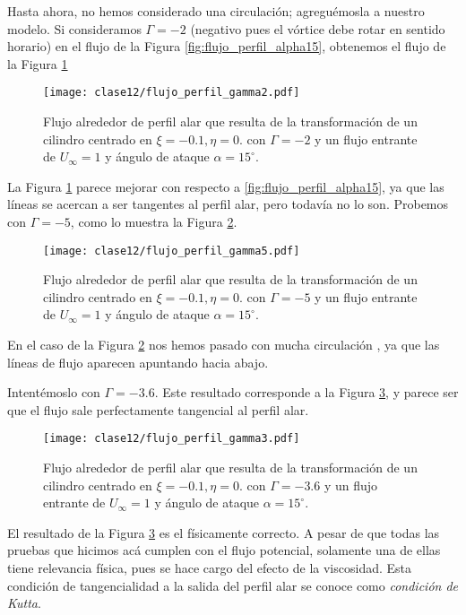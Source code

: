 Hasta ahora, no hemos considerado una circulación; agreguémosla a nuestro modelo.
Si consideramos $\Gamma=-2$ (negativo pues el vórtice debe rotar en sentido horario) en el flujo de la Figura \ref{fig:flujo_perfil_alpha15}, obtenemos el flujo de la Figura \ref{fig:flujo_perfil_gamma2}
%
\begin{figure}[h!]
\centering
\texttt{[image: clase12/flujo\_perfil\_gamma2.pdf]}
\caption{Flujo alrededor de perfil alar que resulta de la transformación de un cilindro centrado en $\xi=-0.1, \eta=0.$ con $\Gamma=-2$ y un flujo entrante de $U_\infty=1$ y ángulo de ataque $\alpha=15^\circ$.}\label{fig:flujo_perfil_gamma2}
\end{figure}

La Figura \ref{fig:flujo_perfil_gamma2} parece mejorar con respecto a \ref{fig:flujo_perfil_alpha15}, ya que las líneas se acercan a ser tangentes al perfil alar, pero todavía no lo son.
Probemos con $\Gamma=-5$, como lo muestra la Figura \ref{fig:flujo_perfil_gamma5}.
%
\begin{figure}[h!]
\centering
\texttt{[image: clase12/flujo\_perfil\_gamma5.pdf]}
\caption{Flujo alrededor de perfil alar que resulta de la transformación de un cilindro centrado en $\xi=-0.1, \eta=0.$ con $\Gamma=-5$ y un flujo entrante de $U_\infty=1$ y ángulo de ataque $\alpha=15^\circ$.}\label{fig:flujo_perfil_gamma5}
\end{figure}

En el caso de la Figura \ref{fig:flujo_perfil_gamma5} nos hemos pasado con mucha circulación , ya que las líneas de flujo aparecen apuntando hacia abajo.

Intentémoslo con $\Gamma=-3.6$.
Este resultado corresponde a la Figura \ref{fig:flujo_perfil_gamma3}, y parece ser que el flujo sale perfectamente tangencial al perfil alar.
%
\begin{figure}[h!]
\centering
\texttt{[image: clase12/flujo\_perfil\_gamma3.pdf]}
\caption{Flujo alrededor de perfil alar que resulta de la transformación de un cilindro centrado en $\xi=-0.1, \eta=0.$ con $\Gamma=-3.6$ y un flujo entrante de $U_\infty=1$ y ángulo de ataque $\alpha=15^\circ$.}\label{fig:flujo_perfil_gamma3}
\end{figure}

El resultado de la Figura \ref{fig:flujo_perfil_gamma3} es el físicamente correcto.
A pesar de que todas las pruebas que hicimos acá cumplen con el flujo potencial, solamente una de ellas tiene relevancia física, pues se hace cargo del efecto de la viscosidad.
Esta condición de tangencialidad a la salida del perfil alar se conoce como \emph{condición de Kutta}.


